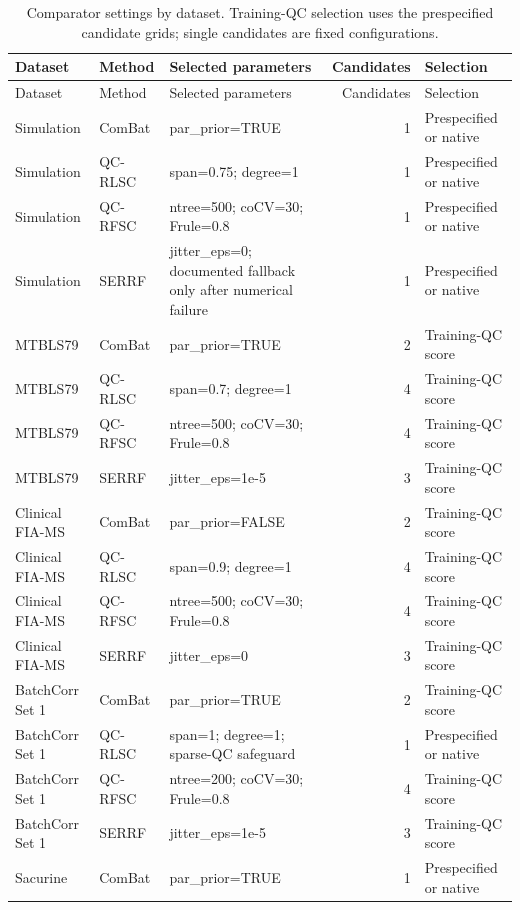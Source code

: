 \begin{landscape}
\scriptsize
\begin{longtable}{p{2.8cm}p{1.6cm}p{8.0cm}rp{3.7cm}}
\caption{Comparator settings by dataset. Training-QC selection uses the prespecified candidate grids; single candidates are fixed configurations.}\label{tab:supp_selected_parameters}\\
\toprule
Dataset & Method & Selected parameters & Candidates & Selection \\
\midrule
\endfirsthead
\toprule
Dataset & Method & Selected parameters & Candidates & Selection \\
\midrule
\endhead
\bottomrule
\endlastfoot
Simulation & ComBat & par\_prior=TRUE & 1 & Prespecified or native \\
Simulation & QC-RLSC & span=0.75; degree=1 & 1 & Prespecified or native \\
Simulation & QC-RFSC & ntree=500; coCV=30; Frule=0.8 & 1 & Prespecified or native \\
Simulation & SERRF & jitter\_eps=0; documented fallback only after numerical failure & 1 & Prespecified or native \\
MTBLS79 & ComBat & par\_prior=TRUE & 2 & Training-QC score \\
MTBLS79 & QC-RLSC & span=0.7; degree=1 & 4 & Training-QC score \\
MTBLS79 & QC-RFSC & ntree=500; coCV=30; Frule=0.8 & 4 & Training-QC score \\
MTBLS79 & SERRF & jitter\_eps=1e-5 & 3 & Training-QC score \\
Clinical FIA-MS & ComBat & par\_prior=FALSE & 2 & Training-QC score \\
Clinical FIA-MS & QC-RLSC & span=0.9; degree=1 & 4 & Training-QC score \\
Clinical FIA-MS & QC-RFSC & ntree=500; coCV=30; Frule=0.8 & 4 & Training-QC score \\
Clinical FIA-MS & SERRF & jitter\_eps=0 & 3 & Training-QC score \\
BatchCorr Set 1 & ComBat & par\_prior=TRUE & 2 & Training-QC score \\
BatchCorr Set 1 & QC-RLSC & span=1; degree=1; sparse-QC safeguard & 1 & Prespecified or native \\
BatchCorr Set 1 & QC-RFSC & ntree=200; coCV=30; Frule=0.8 & 4 & Training-QC score \\
BatchCorr Set 1 & SERRF & jitter\_eps=1e-5 & 3 & Training-QC score \\
Sacurine & ComBat & par\_prior=TRUE & 1 & Prespecified or native \\

\end{longtable}
\end{landscape}
